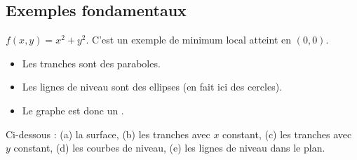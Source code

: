 \subsection{Exemples fondamentaux}


$f(x,y) = x^2 + y^2$. C'est un exemple de minimum local atteint en $(0,0)$.

\begin{itemize}
  \item Les tranches sont des paraboles.
  \item Les lignes de niveau sont des ellipses (en fait ici des cercles).
  \item Le graphe est donc un .
\end{itemize}

Ci-dessous : (a) la surface, (b) les tranches avec $x$ constant, (c) les tranches avec $y$ constant, (d) les courbes de niveau, (e) les lignes de niveau dans le plan.

